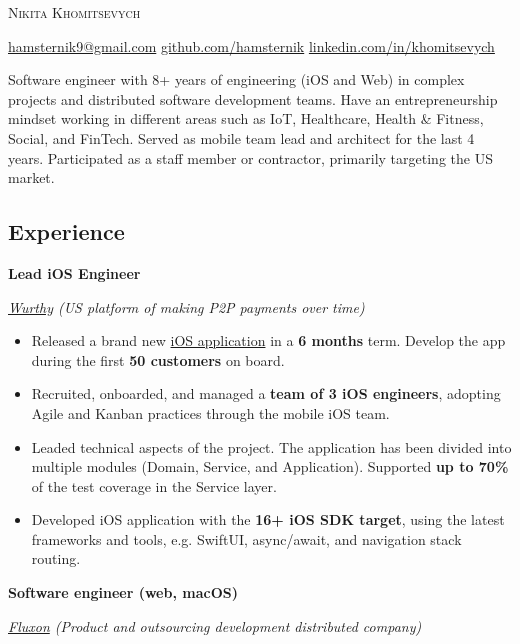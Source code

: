 \documentclass[12pt]{article}
\newcommand{\SectionSpacing}{ %
    \vspace*{1em}
}
\newcommand{\SubSectionSpacing}{
    \vspace*{0.5em}
}
\newcommand{\name}[1]{%
    \Huge %
    \begin{center} \textbf{#1} \end{center}\par
    \normalsize\normalfont%
}
\newcommand{\Experience}[3]{%
    \noindent \textbf{#1}
    \hfill \text{#2} \par
    \noindent \textit{#3} \par
    \normalsize \normalfont \par
}
\begin{document}
\textsc{\huge{Nikita Khomitsevych}}

\SectionSpacing

\noindent
\href{mailto:hamsternik9@gmail.com}{hamsternik9@gmail.com} \text{\textbar}
\href{https://github.com/hamsternik}{github.com/hamsternik} \text{\textbar}
\href{https://www.linkedin.com/in/khomitsevych/}{linkedin.com/in/khomitsevych}

\SectionSpacing

\noindent
Software engineer with 8+ years of engineering (iOS and Web) in complex projects and distributed software development teams. 
Have an entrepreneurship mindset working in different areas such as IoT, Healthcare, Health \& Fitness, Social, and FinTech.
Served as mobile team lead and architect for the last 4 years.
Participated as a staff member or contractor, primarily targeting the US market.


\subsection*{Experience}

\Experience
{Lead iOS Engineer}
{Jan 2023 -- Present}
{\href{https://www.wurthy.co}{Wurthy} (US platform of making P2P payments over time)}

\noindent
\begin{itemize}[label=-]
    \setlength\itemsep{0em}
    \item Released a brand new {\href{https://apps.apple.com/us/app/wurthy/id6446956833}{iOS application}} in a \textbf{6 months} term. Develop the app during the first \textbf{50 customers} on board.
    \item Recruited, onboarded, and managed a \textbf{team of 3 iOS engineers}, adopting Agile and Kanban practices through the mobile iOS team.
    \item Leaded technical aspects of the project. The application has been divided into multiple modules (Domain, Service, and Application). Supported \textbf{up to 70\%} of the test coverage in the Service layer.
    \item Developed iOS application with the \textbf{16+ iOS SDK target}, using the latest frameworks and tools, e.g. SwiftUI, async/await, and navigation stack routing.
\end{itemize}

\SubSectionSpacing

\Experience
{Software engineer (web, macOS)}
{Jun 2022 -- Nov 2022}
{\href{https://www.fluxon.com/}{Fluxon} (Product and outsourcing development distributed company)}
\end{document}
